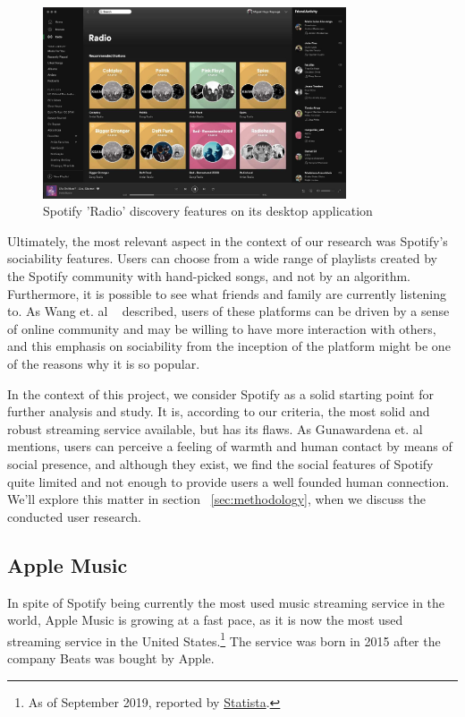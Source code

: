 \begin{figure}[h]
\centering
\includegraphics[width=0.8\textwidth]{./Images/spotify.png}
\caption{Spotify 'Radio' discovery features on its desktop application}
\label{fig:test_env}
\end{figure}

Ultimately, the most relevant aspect in the context of our research was Spotify's sociability features. Users can choose from a wide range of playlists created by the Spotify community with hand-picked songs, and not by an algorithm. Furthermore, it is possible to see what friends and family are currently listening to. As Wang et. al ~\cite{Wang2014} described, users of these platforms can be driven by a sense of online community and may be willing to have more interaction with others, and this emphasis on sociability from the inception of the platform might be one of the reasons why it is so popular.

In the context of this project, we consider Spotify as a solid starting point for further analysis and study. It is, according to our criteria, the most solid and robust streaming service available, but has its flaws. As Gunawardena et. al ~\cite{Gunawardena1997} mentions, users can perceive a feeling of warmth and human contact by means of social presence, and although they exist, we find the social features of Spotify quite limited and not enough to provide users a well founded human connection. We'll explore this matter in section ~\ref{sec:methodology}, when we discuss the conducted user research.

\subsection{Apple Music}

In spite of Spotify being currently the most used music streaming service in the world, Apple Music is growing at a fast pace, as it is now the most used streaming service in the United States.\footnote{As of September 2019, reported by \href{https://www.statista.com/statistics/798125/most-popular-us-music-streaming-services-ranked-by-audience/}{Statista}.} The service was born in 2015 after the company Beats was bought by Apple.

